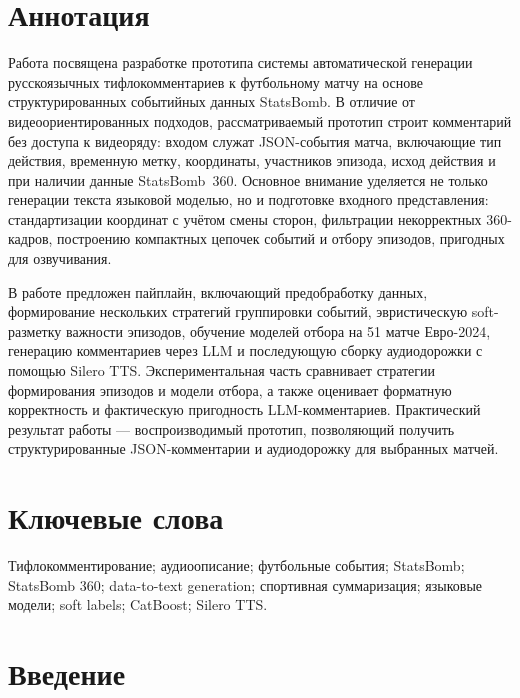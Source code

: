 \documentclass[a4paper,14pt]{extarticle}
\numberwithin{table}{section}
\numberwithin{figure}{section}
\numberwithin{equation}{section}
\begin{document}

\newpage
\setcounter{page}{2}

\tableofcontents
\newpage

\section*{Аннотация}

Работа посвящена разработке прототипа системы автоматической генерации русскоязычных тифлокомментариев к футбольному матчу на основе структурированных событийных данных StatsBomb. В отличие от видеоориентированных подходов, рассматриваемый прототип строит комментарий без доступа к видеоряду: входом служат JSON-события матча, включающие тип действия, временную метку, координаты, участников эпизода, исход действия и при наличии данные StatsBomb~360. Основное внимание уделяется не только генерации текста языковой моделью, но и подготовке входного представления: стандартизации координат с учётом смены сторон, фильтрации некорректных 360-кадров, построению компактных цепочек событий и отбору эпизодов, пригодных для озвучивания.

В работе предложен пайплайн, включающий предобработку данных, формирование нескольких стратегий группировки событий, эвристическую soft-разметку важности эпизодов, обучение моделей отбора на 51 матче Евро-2024, генерацию комментариев через LLM и последующую сборку аудиодорожки с помощью Silero TTS. Экспериментальная часть сравнивает стратегии формирования эпизодов и модели отбора, а также оценивает форматную корректность и фактическую пригодность LLM-комментариев. Практический результат работы --- воспроизводимый прототип, позволяющий получить структурированные JSON-комментарии и аудиодорожку для выбранных матчей.

\section*{Ключевые слова}

Тифлокомментирование; аудиоописание; футбольные события; StatsBomb; StatsBomb 360; data-to-text generation; спортивная суммаризация; языковые модели; soft labels; CatBoost; Silero TTS.

\newpage

\section{Введение}
\end{document}

